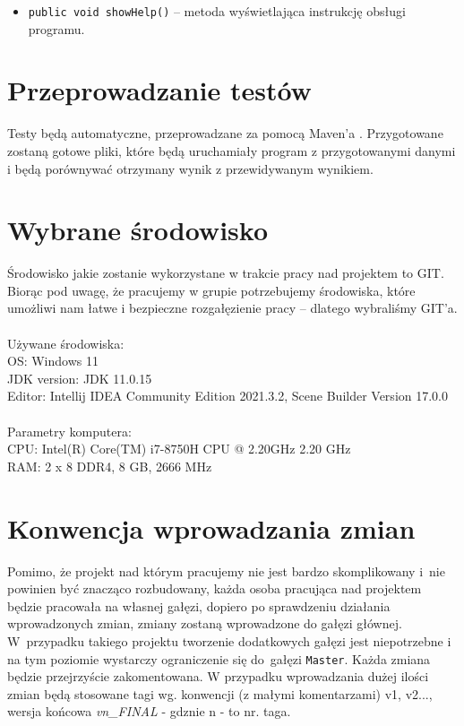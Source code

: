 \documentclass[12pt, a4paper]{article}
\begin{document}
\begin{itemize}
    \item \texttt{public void showHelp()} -- metoda wyświetlająca instrukcję obsługi programu.
\end{itemize}


\section{Przeprowadzanie testów}
Testy będą automatyczne, przeprowadzane za pomocą Maven'a . Przygotowane zostaną gotowe pliki, które będą uruchamiały program z przygotowanymi danymi i będą porównywać otrzymany wynik z przewidywanym wynikiem. 



\section{Wybrane środowisko}
Środowisko jakie zostanie wykorzystane w trakcie pracy nad projektem to GIT. Biorąc pod uwagę, że pracujemy w grupie potrzebujemy środowiska, które umożliwi nam łatwe i bezpieczne rozgałęzienie pracy -- dlatego wybraliśmy GIT'a.\\\\

Używane środowiska:\\
OS: Windows 11\\
JDK version: JDK 11.0.15\\
Editor: Intellij IDEA Community Edition 2021.3.2, Scene Builder Version 17.0.0\\\\
Parametry komputera:\\
CPU: Intel(R) Core(TM) i7-8750H CPU @ 2.20GHz   2.20 GHz\\
RAM: 2 x 8 DDR4, 8 GB, 2666 MHz

\section{Konwencja wprowadzania zmian}
Pomimo, że projekt nad którym pracujemy nie jest bardzo skomplikowany i~nie powinien być znacząco rozbudowany, każda osoba pracująca nad projektem będzie pracowała na własnej gałęzi, dopiero po sprawdzeniu działania wprowadzonych zmian, zmiany zostaną wprowadzone do gałęzi głównej. W~przypadku takiego projektu tworzenie dodatkowych gałęzi jest niepotrzebne i na tym poziomie wystarczy ograniczenie się do~gałęzi \texttt{Master}. Każda zmiana będzie przejrzyście zakomentowana. W przypadku wprowadzania dużej ilości zmian będą stosowane tagi wg. konwencji (z małymi komentarzami) v1, v2..., wersja końcowa \textit{vn\_FINAL} - gdznie n - to nr. taga.
 
\end{document}
